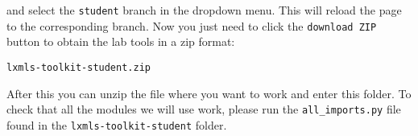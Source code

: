 \noindent and select the \verb+student+ branch in the dropdown menu. This will
reload the page to the corresponding branch. Now you just need to click the
\verb+download ZIP+ button to obtain the lab tools in a zip format:

\begin{verbatim}
lxmls-toolkit-student.zip
\end{verbatim}

After this you can unzip the file where you want to work and enter this folder.
To check that all the modules we will use work, please run the
\verb+all_imports.py+ file found in the \verb+lxmls-toolkit-student+ folder.
